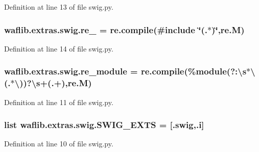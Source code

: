 Definition at line 13 of file swig.\+py.

\subsubsection[{\texorpdfstring{re\+\_\+3}{re_3}}]{\setlength{\rightskip}{0pt plus 5cm}waflib.\+extras.\+swig.\+re\+\_ = re.\+compile(\textquotesingle{}\#include \char`\"{}(.$\ast$)\char`\"{}\textquotesingle{},{\bf re.\+M})}\hypertarget{namespacewaflib_1_1extras_1_1swig_a1828f0c47c854a5b8c23bc029a59f5ec}{}\label{namespacewaflib_1_1extras_1_1swig_a1828f0c47c854a5b8c23bc029a59f5ec}


Definition at line 14 of file swig.\+py.

\subsubsection[{\texorpdfstring{re\+\_\+module}{re_module}}]{\setlength{\rightskip}{0pt plus 5cm}waflib.\+extras.\+swig.\+re\+\_\+module = re.\+compile(\textquotesingle{}\%module(?\+:\textbackslash{}{\bf s}$\ast$\textbackslash{}(.$\ast$\textbackslash{}))?\textbackslash{}{\bf s}+(.+)\textquotesingle{},{\bf re.\+M})}\hypertarget{namespacewaflib_1_1extras_1_1swig_a728a00d859d64d3d29e24f5e1adb520d}{}\label{namespacewaflib_1_1extras_1_1swig_a728a00d859d64d3d29e24f5e1adb520d}


Definition at line 11 of file swig.\+py.

\subsubsection[{\texorpdfstring{S\+W\+I\+G\+\_\+\+E\+X\+TS}{SWIG_EXTS}}]{\setlength{\rightskip}{0pt plus 5cm}list waflib.\+extras.\+swig.\+S\+W\+I\+G\+\_\+\+E\+X\+TS = \mbox{[}\textquotesingle{}.{\bf swig}\textquotesingle{},\textquotesingle{}.{\bf i}\textquotesingle{}\mbox{]}}\hypertarget{namespacewaflib_1_1extras_1_1swig_aac124916bd124dbb04928162df660797}{}\label{namespacewaflib_1_1extras_1_1swig_aac124916bd124dbb04928162df660797}


Definition at line 10 of file swig.\+py.

